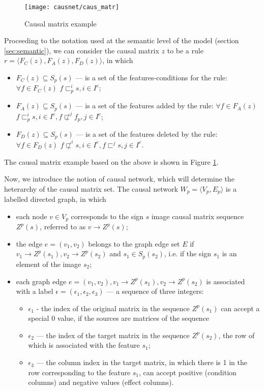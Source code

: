 \documentclass[12pt]{scrartcl}
\begin{document}
	\begin{figure}[H]
		\centering
		\texttt{[image: causnet/caus\_matr]}
		\caption{Causal matrix example}	
		\label{fig:caus_matr}	
	\end{figure}
	
	Proceeding to the notation used at the semantic level of the model (section \ref{sec:semantic}), we can consider the causal matrix $z$ to be a rule $r=\langle F_C(z),F_A(z),F_D(z)\rangle$, in which
	\begin{itemize}
		\item $F_C (z)\subseteq S_p(s)$ --- is a set of the features-conditions for the rule: $\forall f\in F_C(z)$ $f\sqsubset_p^i s, i\in I^c$;
		
		\item $F_A(z)\subseteq S_p(s)$ --- is a set of the features added by the rule: $\forall f\in F_A(z)$ $f\sqsubset_p^i s,i\in I^e, f\not\sqsubset^j f_p, j\in I^c$;
		
		\item $F_D(z)\subseteq S_p(s)$ --- is a set of the features deleted by the rule: $\forall f\in F_D(z)$ $f\not\sqsubset^i s, i\in I^e,f\sqsubset^j s, j\in I^c$.
	\end{itemize}

	The causal matrix example based on the above is shown in Figure \ref{fig:caus_matr}.
	
	Now, we introduce the notion of causal network, which will determine the heterarchy of the causal matrix set. The causal network $W_p=\langle V_p, E_p \rangle$ is a labelled directed graph, in which
	\begin{itemize}
		\item each node $v\in V_p$ corresponds to the sign $s$ image causal matrix sequence $Z^p(s)$, referred to as $v\rightarrow Z^p(s)$;
		\item the edge $e=(v_1, v_2)$ belongs to the graph edge set $E$ if $v_1\rightarrow Z^p(s_1), v_2\rightarrow Z^p(s_2)$ and $s_1\in S_p(s_2)$, i.e. if the sign $s_1$ is an element of the image $s_2$;
		\item each graph edge $e=(v_1, v_2), v_1\rightarrow Z^p(s_1), v_2\rightarrow Z^p(s_2)$ is associated with a label $\epsilon=(\epsilon_1,\epsilon_2,\epsilon_3)$ --- a sequence of three integers:
		\begin{itemize}
			\item $\epsilon_1$ - the index of the original matrix in the sequence $Z^p(s_1)$ can accept a special 0 value, if the sources are matrices of the sequence
			\item $\epsilon_2$ --- the index of the target matrix in the sequence $Z^p(s_2)$, the row of which is associated with the feature $s_1$;
			\item $\epsilon_3$ --- the column index in the target matrix, in which there is 1 in the row corresponding to the feature $s_1$, can accept positive (condition columns) and negative values (effect columns).
		\end{itemize}		
	\end{itemize}
	
\end{document}
